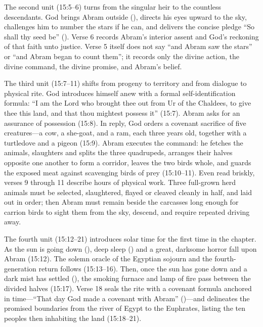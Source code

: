 The second unit (15:5--6) turns from the singular heir to the countless descendants. God brings Abram outside (), directs his eyes upward to the sky, challenges him to number the stars if he can, and delivers the concise pledge ``So shall thy seed be'' (). Verse 6 records Abram's interior assent and God's reckoning of that faith unto justice. Verse 5 itself does not say ``and Abram saw the stars'' or ``and Abram began to count them''; it records only the divine action, the divine command, the divine promise, and Abram's belief.

The third unit (15:7--11) shifts from progeny to territory and from dialogue to physical rite. God introduces himself anew with a formal self-identification formula: ``I am the Lord who brought thee out from Ur of the Chaldees, to give thee this land, and that thou mightest possess it'' (15:7). Abram asks for an assurance of possession (15:8). In reply, God orders a covenant sacrifice of five creatures---a cow, a she-goat, and a ram, each three years old, together with a turtledove and a pigeon (15:9). Abram executes the command: he fetches the animals, slaughters and splits the three quadrupeds, arranges their halves opposite one another to form a corridor, leaves the two birds whole, and guards the exposed meat against scavenging birds of prey (15:10--11). Even read briskly, verses 9 through 11 describe hours of physical work. Three full-grown herd animals must be selected, slaughtered, flayed or cleaved cleanly in half, and laid out in order; then Abram must remain beside the carcasses long enough for carrion birds to sight them from the sky, descend, and require repeated driving away.

The fourth unit (15:12--21) introduces solar time for the first time in the chapter. As the sun is going down (), deep sleep () and a great, darksome horror fall upon Abram (15:12). The solemn oracle of the Egyptian sojourn and the fourth-generation return follows (15:13--16). Then, once the sun has gone down and a dark mist has settled (), the smoking furnace and lamp of fire pass between the divided halves (15:17). Verse 18 seals the rite with a covenant formula anchored in time---``That day God made a covenant with Abram'' ()---and delineates the promised boundaries from the river of Egypt to the Euphrates, listing the ten peoples then inhabiting the land (15:18--21).


